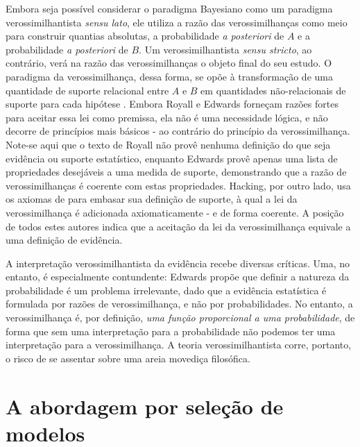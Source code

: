 Embora seja possível considerar o paradigma Bayesiano como um paradigma verossimilhantista {\em sensu lato}, 
ele utiliza a razão das verossimilhanças como meio para construir quantias absolutas, a probabilidade 
{\em a posteriori} de $A$ e a probabilidade {\em a posteriori} de $B$. Um verossimilhantista {\em sensu stricto}, ao contrário,
verá na razão das verossimilhanças
o objeto final do seu estudo. O paradigma da verossimilhança, dessa forma, se opõe à transformação de uma quantidade de 
suporte relacional entre $A$ e $B$ em quantidades não-relacionais de
suporte para cada hipótese \citep{Fitelson07}. %
Embora Royall e Edwards forneçam razões fortes para aceitar essa lei como premissa, ela não é uma necessidade lógica,
e não decorre de princípios mais básicos - ao contrário do princípio da verossimilhança.
Note-se aqui que o texto de Royall não provê nenhuma definição do que seja evidência ou suporte estatístico,
enquanto Edwards provê apenas uma lista de propriedades desejáveis a uma medida de suporte, demonstrando que
a razão de verossimilhanças é coerente com estas propriedades. Hacking, por outro lado, usa os axiomas de 
\citep{Koopman40} para embasar sua definição de suporte, à qual a lei da verossimilhança é adicionada
axiomaticamente - e de forma coerente. A posição de todos estes autores indica que a aceitação da 
lei da verossimilhança equivale a uma definição de evidência. 

A interpretação verossimilhantista da evidência recebe diversas críticas. Uma, no entanto, é especialmente contundente:
Edwards propõe que definir a natureza da probabilidade é um problema irrelevante, dado que a evidência estatística é
formulada por razões de verossimilhança, e não por probabilidades. No entanto, a verossimilhança é, por definição,  
{\em uma função proporcional a uma probabilidade}, de forma que sem uma interpretação para a probabilidade não podemos
ter uma interpretação para a verossimilhança.
A teoria verossimilhantista corre, portanto, o risco de se assentar
sobre uma areia movediça filosófica.

\section{A abordagem por seleção de modelos} 

